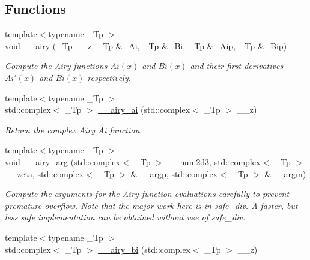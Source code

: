 \subsection*{Functions}
\begin{DoxyCompactItemize}
\item 
{\footnotesize template$<$typename \+\_\+\+Tp $>$ }\\void \hyperlink{namespacestd_1_1____detail_aaf4b5556c6d01bad1892cb1515b22c64}{\+\_\+\+\_\+airy} (\+\_\+\+Tp \+\_\+\+\_\+z, \+\_\+\+Tp \&\+\_\+\+Ai, \+\_\+\+Tp \&\+\_\+\+Bi, \+\_\+\+Tp \&\+\_\+\+Aip, \+\_\+\+Tp \&\+\_\+\+Bip)
\begin{DoxyCompactList}\small\item\em Compute the Airy functions $ Ai(x) $ and $ Bi(x) $ and their first derivatives $ Ai'(x) $ and $ Bi(x) $ respectively. \end{DoxyCompactList}\item 
{\footnotesize template$<$typename \+\_\+\+Tp $>$ }\\std\+::complex$<$ \+\_\+\+Tp $>$ \hyperlink{namespacestd_1_1____detail_afd48b5702344f832a250922ac4ffb917}{\+\_\+\+\_\+airy\+\_\+ai} (std\+::complex$<$ \+\_\+\+Tp $>$ \+\_\+\+\_\+z)
\begin{DoxyCompactList}\small\item\em Return the complex Airy Ai function. \end{DoxyCompactList}\item 
{\footnotesize template$<$typename \+\_\+\+Tp $>$ }\\void \hyperlink{namespacestd_1_1____detail_a2473fe60310e9480137e3b66d3944f15}{\+\_\+\+\_\+airy\+\_\+arg} (std\+::complex$<$ \+\_\+\+Tp $>$ \+\_\+\+\_\+num2d3, std\+::complex$<$ \+\_\+\+Tp $>$ \+\_\+\+\_\+zeta, std\+::complex$<$ \+\_\+\+Tp $>$ \&\+\_\+\+\_\+argp, std\+::complex$<$ \+\_\+\+Tp $>$ \&\+\_\+\+\_\+argm)
\begin{DoxyCompactList}\small\item\em Compute the arguments for the Airy function evaluations carefully to prevent premature overflow. Note that the major work here is in {\ttfamily safe\+\_\+div}. A faster, but less safe implementation can be obtained without use of safe\+\_\+div. \end{DoxyCompactList}\item 
{\footnotesize template$<$typename \+\_\+\+Tp $>$ }\\std\+::complex$<$ \+\_\+\+Tp $>$ \hyperlink{namespacestd_1_1____detail_ae5536305d721e393efe1a74f0e57653e}{\+\_\+\+\_\+airy\+\_\+bi} (std\+::complex$<$ \+\_\+\+Tp $>$ \+\_\+\+\_\+z)

\end{DoxyCompactItemize}

